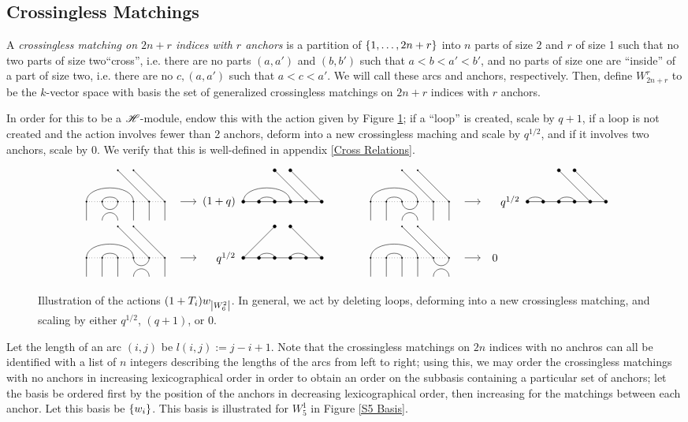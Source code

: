 \documentclass{amsart}
\begin{document}
\subsection{Crossingless Matchings}
\begin{definition}
  A \emph{crossingless matching on $2n+r$ indices with $r$ anchors} is a partition of $\left\{ 1,\dots,2n+r \right\}$ into $n$ parts of size $2$ and $r$ of size 1 such that no two parts of size two``cross'', i.e. there are no parts $(a,a')$ and $(b,b')$ such that $a < b < a' < b'$, and no parts of size one are ``inside'' of a part of size two, i.e. there are no $c, (a,a')$ such that $a < c < a'$.
  We will call these arcs and anchors, respectively.
  Then, define $W^r_{2n+r}$ to be the $k$-vector space with basis the set of generalized crossingless matchings on $2n+r$ indices with $r$ anchors.

  In order for this to be a $\mathscr{H}$-module, endow this with the action given by Figure \ref{Action}; 
  if a ``loop'' is created, scale by $q+1$, if a loop is not created and the action involves fewer than 2 anchors, deform into a new crossingless maching and scale by $q^{1/2}$, and if it involves two anchors, scale by 0.
  We verify that this is well-defined in appendix \ref{Cross Relations}.
\end{definition}

\begin{figure}
  \[
    \begin{tabular}{l l}
      \GeneralizedAction{6}{1/4,2/3}{2}{5/1,6/2}{1}{2}{1/4, 2/3}{5/1,6/2}{(1+q)}
      \hspace{20pt}
      &
      \GeneralizedAction{6}{1/4,2/3}{2}{5/1,6/2}{1}{3}{1/2, 3/4}{5/1,6/2}{q^{1/2}}\\
      \GeneralizedAction{6}{1/4,2/3}{2}{5/1,6/2}{1}{4}{2/3, 4/5}{1/1,6/2}{q^{1/2}}
      &
      \GeneralizedZeroAction{6}{1/4,2/3}{2}{5/1,6/2}{1}{5}
    \end{tabular}
  \]
    
  \caption{Illustration of the actions $(1 + T_i)w_{\left| W^2_6 \right|}$.
    In general, we act by deleting loops, deforming into a new crossingless matching, and scaling by either $q^{1/2}$, $(q + 1)$, or 0.
  }
  \label{Action}
\end{figure}

Let the length of an arc $(i,j)$ be $l(i,j) := j - i + 1$.
Note that the crossingless matchings on $2n$ indices with no anchros can all be identified with a list of $n$ integers describing the lengths of the arcs from left to right;
using this, we may order the crossingless matchings with no anchors in increasing lexicographical order in order to obtain an order on the subbasis containing a particular set of anchors;
let the basis be ordered first by the position of the anchors in decreasing lexicographical order, then increasing for the matchings between each anchor.
Let this basis be $\left\{ w_i \right\}$.
This basis is illustrated for $W_{5}^1$ in Figure \ref{S5 Basis}. 
\end{document}
